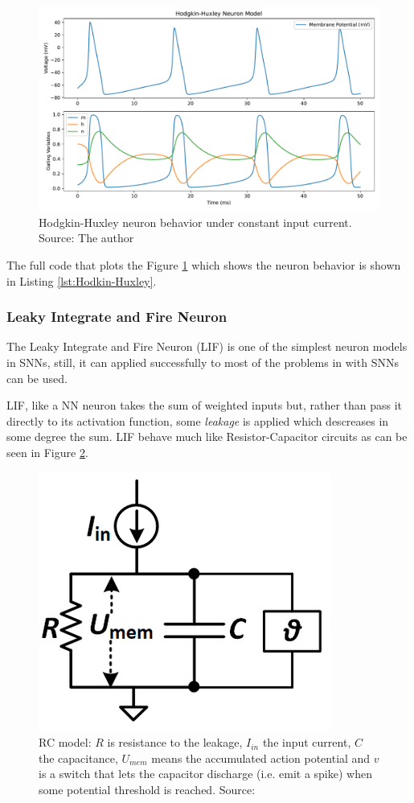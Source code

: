 			\begin{figure}[H]
				\centering
				\includegraphics[width=0.7\linewidth]{images/hodkinHuxleyNeuronBehavior}
				\caption[Hodgkin-Huxley neuron behavior]{Hodgkin-Huxley neuron behavior under constant input current. Source: The author}
				\label{fig:hodkinhuxleyneuronbehavior}
			\end{figure}
			
			\par The full code that plots the Figure \ref{fig:hodkinhuxleyneuronbehavior} which shows the neuron behavior is shown in Listing \ref{lst:Hodkin-Huxley}.
			
			

		\subsubsection{Leaky Integrate and Fire Neuron}
			\par The Leaky Integrate and Fire Neuron (LIF) is one of the simplest neuron models in SNNs, still, it can applied successfully to most of the problems in with SNNs can be used.
			\par LIF, like a NN neuron takes the sum of weighted inputs but, rather than pass it directly to its activation function, some \textit{leakage} is applied which descreases in some degree the sum. LIF behave much like Resistor-Capacitor circuits as can be seen in Figure \ref{fig:rcmodel}.
			
			\begin{figure}[H]
				\centering
				\includegraphics[width=0.2\linewidth]{images/rcmodel}
				\caption[The RC model]{RC model: $R$ is resistance to the leakage, $I_{in}$ the input current, $C$ the capacitance, $U_{mem}$ means the accumulated action potential and $v$ is a switch that lets the capacitor discharge (i.e. emit a spike) when some potential threshold is reached. Source: \cite{10242251}}
				\label{fig:rcmodel}
			\end{figure}
			
